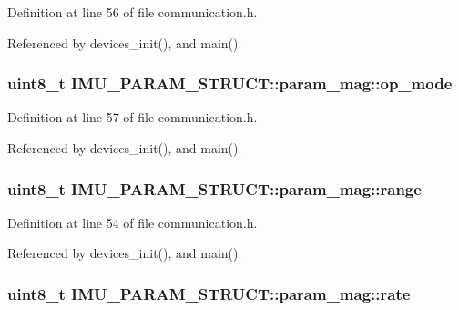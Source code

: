 Definition at line 56 of file communication.\-h.



Referenced by devices\-\_\-init(), and main().

\hypertarget{structIMU__PARAM__STRUCT_1_1param__mag_a39b83b3e9ff5bdcafed0bdf6a2de584b}{
\subsubsection[{op\-\_\-mode}]{\setlength{\rightskip}{0pt plus 5cm}uint8\-\_\-t I\-M\-U\-\_\-\-P\-A\-R\-A\-M\-\_\-\-S\-T\-R\-U\-C\-T\-::param\-\_\-mag\-::op\-\_\-mode}}\label{structIMU__PARAM__STRUCT_1_1param__mag_a39b83b3e9ff5bdcafed0bdf6a2de584b}


Definition at line 57 of file communication.\-h.



Referenced by devices\-\_\-init(), and main().

\hypertarget{structIMU__PARAM__STRUCT_1_1param__mag_a40ad27ebdb5fde35257b1dc52e40f476}{
\subsubsection[{range}]{\setlength{\rightskip}{0pt plus 5cm}uint8\-\_\-t I\-M\-U\-\_\-\-P\-A\-R\-A\-M\-\_\-\-S\-T\-R\-U\-C\-T\-::param\-\_\-mag\-::range}}\label{structIMU__PARAM__STRUCT_1_1param__mag_a40ad27ebdb5fde35257b1dc52e40f476}


Definition at line 54 of file communication.\-h.



Referenced by devices\-\_\-init(), and main().

\hypertarget{structIMU__PARAM__STRUCT_1_1param__mag_a234de95423b604b05b851ef90890cea1}{
\subsubsection[{rate}]{\setlength{\rightskip}{0pt plus 5cm}uint8\-\_\-t I\-M\-U\-\_\-\-P\-A\-R\-A\-M\-\_\-\-S\-T\-R\-U\-C\-T\-::param\-\_\-mag\-::rate}}\label{structIMU__PARAM__STRUCT_1_1param__mag_a234de95423b604b05b851ef90890cea1}


